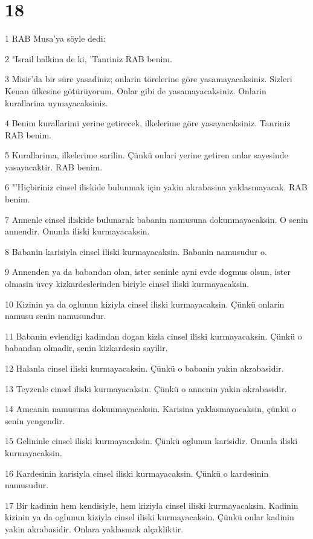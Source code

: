 \chapter{18}

\par 1 RAB Musa'ya söyle dedi:
\par 2 "Israil halkina de ki, 'Tanriniz RAB benim.
\par 3 Misir'da bir süre yasadiniz; onlarin törelerine göre yasamayacaksiniz. Sizleri Kenan ülkesine götürüyorum. Onlar gibi de yasamayacaksiniz. Onlarin kurallarina uymayacaksiniz.
\par 4 Benim kurallarimi yerine getirecek, ilkelerime göre yasayacaksiniz. Tanriniz RAB benim.
\par 5 Kurallarima, ilkelerime sarilin. Çünkü onlari yerine getiren onlar sayesinde yasayacaktir. RAB benim.
\par 6 "'Hiçbiriniz cinsel iliskide bulunmak için yakin akrabasina yaklasmayacak. RAB benim.
\par 7 Annenle cinsel iliskide bulunarak babanin namusuna dokunmayacaksin. O senin annendir. Onunla iliski kurmayacaksin.
\par 8 Babanin karisiyla cinsel iliski kurmayacaksin. Babanin namusudur o.
\par 9 Annenden ya da babandan olan, ister seninle ayni evde dogmus olsun, ister olmasin üvey kizkardeslerinden biriyle cinsel iliski kurmayacaksin.
\par 10 Kizinin ya da oglunun kiziyla cinsel iliski kurmayacaksin. Çünkü onlarin namusu senin namusundur.
\par 11 Babanin evlendigi kadindan dogan kizla cinsel iliski kurmayacaksin. Çünkü o babandan olmadir, senin kizkardesin sayilir.
\par 12 Halanla cinsel iliski kurmayacaksin. Çünkü o babanin yakin akrabasidir.
\par 13 Teyzenle cinsel iliski kurmayacaksin. Çünkü o annenin yakin akrabasidir.
\par 14 Amcanin namusuna dokunmayacaksin. Karisina yaklasmayacaksin, çünkü o senin yengendir.
\par 15 Gelininle cinsel iliski kurmayacaksin. Çünkü oglunun karisidir. Onunla iliski kurmayacaksin.
\par 16 Kardesinin karisiyla cinsel iliski kurmayacaksin. Çünkü o kardesinin namusudur.
\par 17 Bir kadinin hem kendisiyle, hem kiziyla cinsel iliski kurmayacaksin. Kadinin kizinin ya da oglunun kiziyla cinsel iliski kurmayacaksin. Çünkü onlar kadinin yakin akrabasidir. Onlara yaklasmak alçakliktir.
